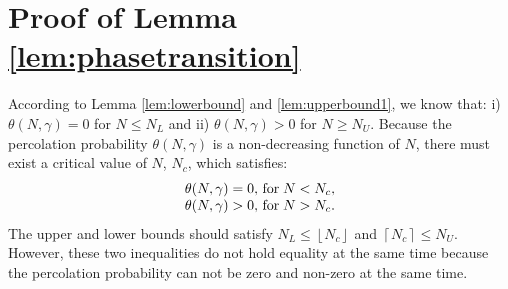 \documentclass[final]{IEEEtran}
\begin{document}
\section{Proof of Lemma \ref{lem:phasetransition}}\label{app:phasetransition}
\indent According to Lemma \ref{lem:lowerbound} and \ref{lem:upperbound1}, we know that: i) $\theta(N,\gamma)=0$ for $N\leq N_L$ and ii) $\theta(N,\gamma)>0$ for $N\geq N_U$. Because the percolation probability $\theta(N,\gamma)$ is a non-decreasing function of $N$, there must exist a critical value of $N$, \ie $N_c$, which satisfies:
\begin{equation}
    \begin{array}{c}
        \theta(N,\gamma)=0,\, {\rm for}\; N< N_c,\\
        \theta(N,\gamma)>0,\, {\rm for}\; N> N_c. 
    \end{array}
\end{equation}
The upper and lower bounds should satisfy $N_L\leq \left\lfloor N_c\right\rfloor$ and $\left\lceil N_c\right\rceil\leq N_U$. However, these two inequalities do not hold equality at the same time because the percolation probability can not be zero and non-zero at the same time.
\end{document}
